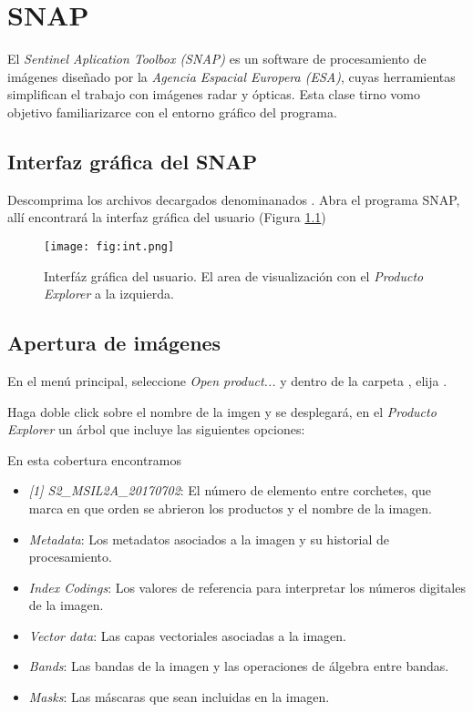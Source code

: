 \chapter{SNAP}

El \emph{Sentinel Aplication Toolbox (SNAP)} es un  software de procesamiento de imágenes diseñado por la \emph{Agencia Espacial Europera (ESA)}, cuyas herramientas simplifican el trabajo con imágenes radar y ópticas.
Esta clase tirno vomo objetivo familiarizarce con el entorno gráfico del programa.

\section{Interfaz gráfica del SNAP}

Descomprima los archivos decargados denominanados . Abra el programa SNAP, allí encontrará la interfaz gráfica del usuario (Figura \ref{fig:int})

\begin{figure}[h!]
    \centering
    \texttt{[image: fig:int.png]}
    \caption{Interfáz gráfica del usuario. El area de visualización con el \emph{Producto Explorer} a la izquierda.}
    \label{fig:int}
\end{figure}

\section{Apertura de imágenes}

En el menú principal, seleccione \emph{Open product...} y dentro de la carpeta , elija .

Haga doble click sobre el nombre de la imgen y se desplegará, en el \emph{Producto Explorer} un árbol que incluye las siguientes opciones:

En esta cobertura encontramos

\begin{itemize}
    \item \emph{[1] S2\_MSIL2A\_20170702}: El número de elemento entre corchetes, que marca en que orden se abrieron los productos y el nombre de la imagen.
    \item \emph{Metadata}: Los metadatos asociados a la imagen y su historial de procesamiento.
    \item \emph{Index Codings}: Los valores de referencia para interpretar los números digitales de la imagen.
    \item \emph{Vector data}: Las capas vectoriales asociadas a la imagen.
    \item \emph{Bands}: Las bandas de la imagen y las operaciones de álgebra entre bandas.
    \item \emph{Masks}: Las máscaras que sean incluidas en la imagen.
\end{itemize}

